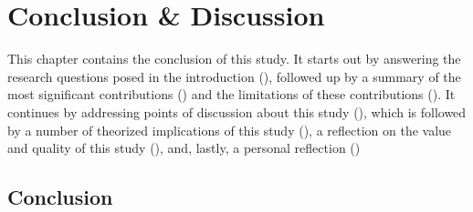 \chapter{Conclusion \& Discussion}
\label{chap:conclusion}



This chapter contains the conclusion of this study. 
It starts out by answering the research questions posed in the introduction (), followed up by a summary of the most significant contributions () and the limitations of these contributions ().
It continues by addressing points of discussion about this study (), which is followed by a number of theorized implications of this study (), a reflection on the value and quality of this study
(), and, lastly, a personal reflection ()



\section{Conclusion}
\label{sec:conclusion}

